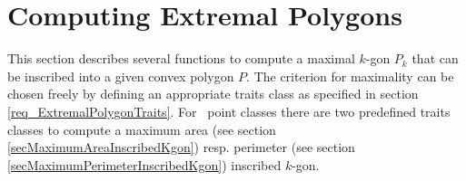 
\clearpage
\section{Computing Extremal Polygons}
\label{secComputingExtremalPolygons}
\cgalColumnLayout

This section describes several functions to compute a maximal $k$-gon
$P_k$ that can be inscribed into a given convex polygon $P$. The
criterion for maximality can be chosen freely by defining an
appropriate traits class as specified in section
\ref{req_ExtremalPolygonTraits}. For \cgal\ point classes there are
two predefined traits classes to compute a maximum area (see section
\ref{secMaximumAreaInscribedKgon}) resp.  perimeter (see section
\ref{secMaximumPerimeterInscribedKgon}) inscribed $k$-gon.


